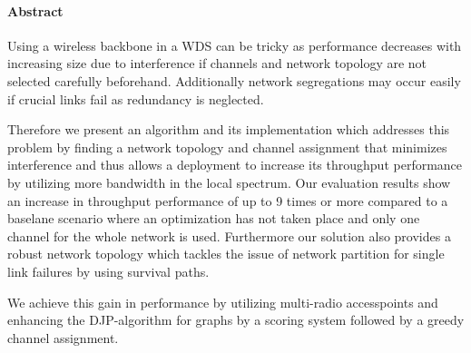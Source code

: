 \cleardoublepage

\vspace {2cm}
\begin{center}
\paragraph{Abstract}
\hrulefill
\end{center}
Using a wireless backbone in a \ac{WDS} can be tricky as performance decreases with increasing size due to interference if 
channels and network topology are not selected carefully beforehand. Additionally network segregations may occur easily if 
crucial links fail as redundancy is neglected.

Therefore we present an algorithm and its implementation which addresses this problem by finding a network topology and channel assignment 
that minimizes interference and thus allows a deployment to increase its throughput performance by utilizing more bandwidth in the local spectrum. 
Our evaluation results show an increase in throughput performance of up to 9 times or more compared to a baselane scenario where an optimization has not taken place
and only one channel for the whole network is used.
Furthermore our solution also provides a robust network topology which tackles the issue of network partition for single link failures by using survival paths.

We achieve this gain in performance by utilizing multi-radio accesspoints and enhancing the \ac{DJP}-algorithm for graphs by a scoring system followed
by a greedy channel assignment.


